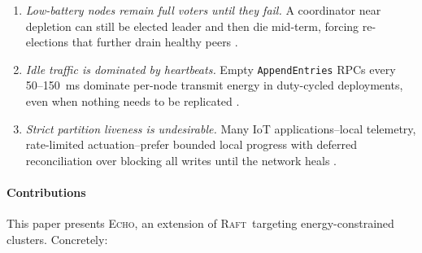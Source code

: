 \documentclass[conference]{IEEEtran}
\newcommand{\echoproto}{\textsc{Echo}\xspace}
\newcommand{\raftproto}{\textsc{Raft}\xspace}
\begin{document}
\begin{enumerate}
\item \emph{Low-battery nodes remain full voters until they fail.} A
  coordinator near depletion can still be elected leader and then die
  mid-term, forcing re-elections that further drain healthy peers
  \cite{barros2023edraft,nakagawa2017energy}.
\item \emph{Idle traffic is dominated by heartbeats.} Empty
  \texttt{AppendEntries} RPCs every 50--150~ms dominate per-node transmit
  energy in duty-cycled deployments, even when nothing needs to be
  replicated \cite{paris2015reducing,xu2021weighted}.
\item \emph{Strict partition liveness is undesirable.} Many IoT
  applications--local telemetry, rate-limited actuation--prefer bounded
  local progress with deferred reconciliation over blocking all writes
  until the network heals \cite{blanco2023pycloudiot,yang2025lrdraft}.
\end{enumerate}

\paragraph*{Contributions} This paper presents \echoproto, an extension
of \raftproto\ targeting energy-constrained clusters. Concretely:
\end{document}
